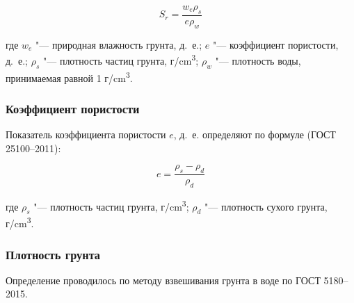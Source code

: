 \[
   S_r = \frac{w_e \rho_s}{e \rho_w}
\]

где $w_e$ "--- природная влажность грунта, д.~е.;
$e$ "--- коэффициент пористости, д.~е.;
$\rho_s$ "--- плотность частиц грунта, г/\si{\centi\meter^3};
$\rho_w$ "--- плотность воды, принимаемая равной 1 г/\si{\centi\meter^3}.

\subsubsection{Коэффициент пористости}

Показатель коэффициента пористости  $e$, д.~е. определяют по формуле (ГОСТ 25100--2011): 

\[
   \textit{e} = \frac{\rho_s-\rho_d}{\rho_d}
\]

где $\rho_s$ "--- плотность частиц грунта, г/\si{\centi\meter^3};
$\rho_d$ "--- плотность сухого грунта, г/\si{\centi\meter^3}.

\subsubsection{Плотность грунта}

Определение проводилось по методу взвешивания грунта в воде по ГОСТ 5180--2015. 

